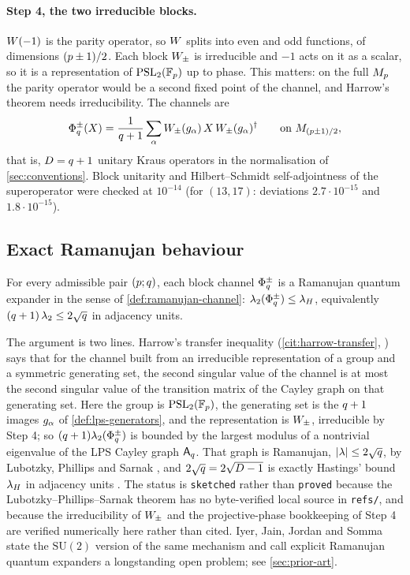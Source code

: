 \paragraph{Step 4, the two irreducible blocks.} $W(-1)$ is the parity
operator, so $W$ splits into even and odd functions, of dimensions
$(p\pm1)/2$. Each block $W_{\pm}$ is irreducible and $-1$ acts on it as a
scalar, so it is a representation of $\mathrm{PSL}_2(\mathbb F_p)$ up to phase. This matters:
on the full $M_{p}$ the parity operator would be a second fixed point of the
channel, and Harrow's theorem needs irreducibility. The channels are
\[
  \Phi_{q}^{\pm}(X)
  = \frac{1}{q+1}\sum_{\alpha}W_{\pm}(g_{\alpha})\,X\,W_{\pm}(g_{\alpha})^\dagger
  \qquad\text{on } M_{(p\pm1)/2},
\]
that is, $D = q+1$ unitary Kraus operators in the normalisation of
\cref{sec:conventions}. Block unitarity and Hilbert--Schmidt self-adjointness
of the superoperator were checked at $10^{-14}$ (for $(13,17)$: deviations
$2.7\cdot10^{-15}$ and $1.8\cdot10^{-15}$).

\subsection{Exact Ramanujan behaviour}

\begin{proposition}
\label{prop:weil-lps-exactly-ramanujan}
For every admissible pair $(p;q)$, each block channel
$\Phi_{q}^{\pm}$ is a Ramanujan quantum expander in the sense of
\cref{def:ramanujan-channel}: $\lambda_2(\Phi_{q}^{\pm})\le\lambda_H$, equivalently
$(q+1)\,\lambda_2 \le 2\sqrt{q}$ in adjacency units.
\end{proposition}

The argument is two lines. Harrow's transfer inequality
(\cref{cit:harrow-transfer}, \cite{harrow2008cayley}) says that for the channel
built from an irreducible representation of a group and a symmetric generating
set, the second singular value of the channel is at most the second singular
value of the transition matrix of the Cayley graph on that generating set. Here
the group is $\mathrm{PSL}_2(\mathbb F_p)$, the generating set is the $q+1$ images $g_{\alpha}$ of
\cref{def:lps-generators}, and the representation is $W_{\pm}$, irreducible by
Step 4; so $(q+1)\lambda_2(\Phi_{q}^{\pm})$ is bounded by the largest modulus
of a nontrivial eigenvalue of the LPS Cayley graph $\mathsf A_{q}$. That graph is
Ramanujan, $\lvert\lambda\rvert\le2\sqrt{q}$, by Lubotzky, Phillips and Sarnak
\cite{lubotzky1988ramanujan}, and $2\sqrt{q} = 2\sqrt{D-1}$ is exactly
Hastings' bound $\lambda_H$ in adjacency units \cite{hastings2007random}. The status
is \texttt{sketched} rather than \texttt{proved} because the Lubotzky--Phillips--Sarnak
theorem has no byte-verified local source in \texttt{refs/}, and because the
irreducibility of $W_{\pm}$ and the projective-phase bookkeeping of Step 4 are
verified numerically here rather than cited. Iyer, Jain, Jordan and Somma
\cite{iyer2026ramanujan} state the $\mathrm{SU}(2)$ version of the same
mechanism and call explicit Ramanujan quantum expanders a longstanding open
problem; see \cref{sec:prior-art}.

